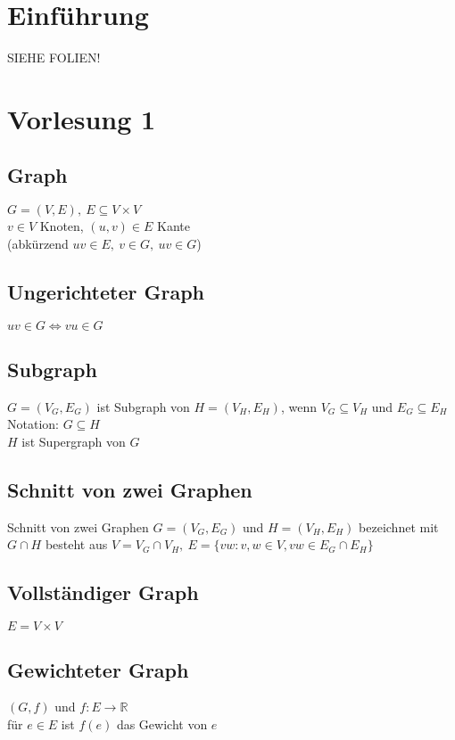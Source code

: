 \documentclass{article}
\begin{document}
	
\section{Einführung}
SIEHE FOLIEN!

\section{Vorlesung 1}
\subsection*{Graph}
$G = (V, E), \ E \subseteq V \times V$ \\
$v \in V$ Knoten, $(u,v) \in E$ Kante \\
(abkürzend $uv \in E, \ v \in G, \ uv \in G$)

\subsection*{Ungerichteter Graph}
$uv \in G \Leftrightarrow vu \in G$

\subsection*{Subgraph}
$G = (V_G, E_G)$ ist Subgraph von $H = (V_H, E_H)$, wenn $V_G \subseteq
V_H$ und $E_G \subseteq E_H$ \\
Notation: $G \subseteq H$ \\
$H$ ist Supergraph von $G$

\subsection*{Schnitt von zwei Graphen}
Schnitt von zwei Graphen $G = (V_G,E_G)$ und $H = (V_H,E_H)$ bezeichnet
mit $G \cap H$ besteht aus $V = V_G \cap V_H, \ E = \{ vw: v,w \in V, vw
\in E_G \cap E_H\}$

\subsection*{Vollständiger Graph}
$E = V \times V$

\subsection*{Gewichteter Graph}
$(G,f)$ und $f: E \rightarrow \mathbb{R}$ \\
für $e \in E$ ist $f(e)$ das Gewicht von $e$
\end{document}
